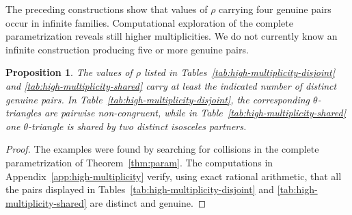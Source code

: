 \documentclass[11pt]{amsart}
\theoremstyle{plain}
\newtheorem{prop}[thm]{Proposition}
\theoremstyle{remark}
\theoremstyle{plain}
\begin{document}
The preceding constructions show that values of $\rho$ carrying four
genuine pairs occur in infinite families. Computational exploration of the
complete parametrization reveals still higher multiplicities. We do
not currently know an infinite construction producing five or more
genuine pairs.


\begin{prop}\label{prop:high-multiplicity}
The values of $\rho$ listed in
Tables~\ref{tab:high-multiplicity-disjoint} and
\ref{tab:high-multiplicity-shared} carry at least the indicated
number of distinct genuine pairs. In
Table~\ref{tab:high-multiplicity-disjoint}, the corresponding
$\theta$-triangles are pairwise non-congruent, while in
Table~\ref{tab:high-multiplicity-shared} one $\theta$-triangle is
shared by two distinct isosceles partners.
\end{prop}

\begin{proof}
The examples were found by searching for collisions in the complete
parametrization of Theorem~\ref{thm:param}. The computations in
Appendix~\ref{app:high-multiplicity} verify, using exact rational
arithmetic, that all the pairs displayed in
Tables~\ref{tab:high-multiplicity-disjoint} and
\ref{tab:high-multiplicity-shared} are distinct and genuine.
\end{proof}
\end{document}
